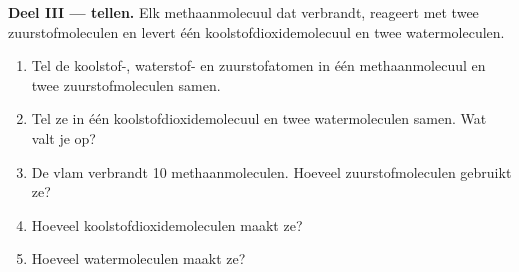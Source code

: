\begin{problem}
\medskip
\noindent\textbf{Deel III ---  tellen.}
Elk methaanmolecuul dat verbrandt, reageert met twee zuurstofmoleculen
en levert één koolstofdioxidemolecuul en twee watermoleculen.
\begin{enumerate}[resume]
  \item Tel de koolstof-, waterstof- en zuurstofatomen in één
        methaanmolecuul en twee zuurstofmoleculen samen.
  \item Tel ze in één koolstofdioxidemolecuul en twee watermoleculen
        samen. Wat valt je op?
  \item De vlam verbrandt 10 methaanmoleculen. Hoeveel zuurstofmoleculen
        gebruikt ze?
  \item Hoeveel koolstofdioxidemoleculen maakt ze?
  \item Hoeveel watermoleculen maakt ze?
\end{enumerate}
\end{problem}
